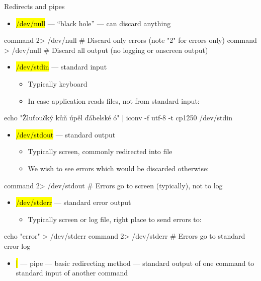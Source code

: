 \documentclass[compress, ucs, xelatex, 11pt, xcolor=svgnames, aspectratio=169,
	hyperref={
		bookmarks=true,
		unicode=true,
		colorlinks=true,
		pdftitle={Linux, command line and MetaCentrum},
		plainpages=false,
		pdfauthor={Vojtech Zeisek},
		pdfsubject={Course about use of Linux command line, writing shell scripts and using MetaCentrum of CESNET},
		pdfcreator={XeLaTeX},
		pdfkeywords={Linux, GNU, BASH, shell, command line, MetaCentrum},
		linkcolor=DarkRed, %
		anchorcolor=DarkBlue, %
		citecolor=Indigo, %
		filecolor=NavyBlue, %
		menucolor=DarkMagenta, %
		urlcolor=DarkBlue, %
		pdftex},
	url={hyphens, lowtilde} %
	]{beamer}
\renewcommand{\texttt}[1]{\hl{\ttfamily #1}}
\begin{document}
\begin{frame}[fragile]{Redirects and pipes}
	\label{pipe}
	\begin{itemize}
		\item \texttt{/dev/null} --- \enquote{black hole} --- can discard anything
	\end{itemize}
	\begin{bashcode}
    command 2> /dev/null # Discard only errors (note "2" for errors only)
    command > /dev/null # Discard all output (no logging or onscreen output)
	\end{bashcode}
	\begin{itemize}
		\item \texttt{/dev/stdin} --- standard input
		\begin{itemize}
			\item Typically keyboard
			\item In case application reads files, not from standard input:
		\end{itemize}
	\end{itemize}
	\begin{bashcode}
    echo "Žluťoučký kůň úpěl ďábelské ó" | iconv -f utf-8 -t cp1250 /dev/stdin
	\end{bashcode}
	\begin{itemize}
		\item \texttt{/dev/stdout} --- standard output
		\begin{itemize}
			\item Typically screen, commonly redirected into file
			\item We wish to see errors which would be discarded otherwise:
		\end{itemize}
	\end{itemize}
	\begin{bashcode}
    command 2> /dev/stdout # Errors go to screen (typically), not to log
	\end{bashcode}
	\begin{itemize}
		\item \texttt{/dev/stderr} --- standard error output
		\begin{itemize}
			\item Typically screen or log file, right place to send errors to:
		\end{itemize}
	\end{itemize}
	\begin{bashcode}
    echo "error" > /dev/stderr
    command 2> /dev/stderr # Errors go to standard error log
	\end{bashcode}
	\begin{itemize}
		\item \texttt{|} --- pipe --- basic redirecting method --- standard output of one command to standard input of another command
	\end{itemize}
\end{frame}
\end{document}
